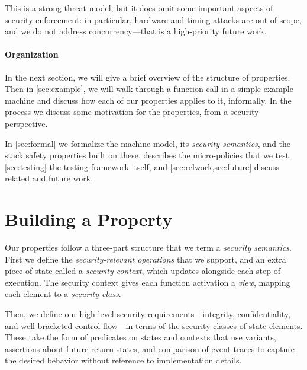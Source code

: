 \documentclass[10pt,conference]{ieeetran}%
\theoremstyle{definition}
\begin{document}
This is a strong threat model, but it does omit some important aspects of
security enforcement: in particular, hardware and timing attacks are out of scope, and
we do not address concurrency---that is a high-priority future work.
%

\paragraph*{Organization}

In the next section, we will give a brief overview of the structure of properties.
Then in \cref{sec:example}, we will walk through a function
call in a simple example machine and discuss how each of our properties applies to it,
informally. In the process we discuss some motivation for the properties, from a security
perspective.

In \cref{sec:formal} we formalize the machine model, 
its {\em security semantics}, and the stack safety properties built on these. 
 describes the micro-policies that we test,
\cref{sec:testing} the testing framework itself, and
\cref{sec:relwork,sec:future} discuss related and future work.


\section{Building a Property}
\label{sec:ideas}

Our properties follow a three-part structure that we term a {\em security semantics}.
First we define the {\em security-relevant operations} that we support, and an extra
piece of state called a {\em security context}, which updates alongside each step
of execution. The security context gives each function activation a {\em view},
mapping each element to a {\em security class}.

Then, we define our high-level security requirements---integrity, confidentiality,
and well-bracketed control flow---in terms of the security classes of state
elements. These take the form of predicates on states and contexts that use variants,
assertions about future return states, and comparison of event traces to capture the
desired behavior without reference to implementation details.
\end{document}
